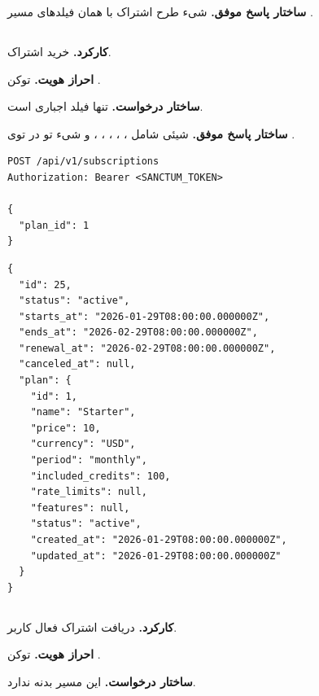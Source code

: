 \textbf{ساختار پاسخ موفق.} شیء طرح اشتراک با همان فیلدهای مسیر
.

\subsection{}
\textbf{کارکرد.} خرید اشتراک.

\textbf{احراز هویت.} توکن .

\textbf{ساختار درخواست.} تنها فیلد اجباری  است.

\textbf{ساختار پاسخ موفق.} شیئی شامل ، ،
، ، ،
 و شیء تو در توی .

\begin{latin}
\begin{lstlisting}[style=jsonStyle]
POST /api/v1/subscriptions
Authorization: Bearer <SANCTUM_TOKEN>

{
  "plan_id": 1
}
\end{lstlisting}
\end{latin}


\begin{latin}
\begin{lstlisting}[style=jsonStyle]
{
  "id": 25,
  "status": "active",
  "starts_at": "2026-01-29T08:00:00.000000Z",
  "ends_at": "2026-02-29T08:00:00.000000Z",
  "renewal_at": "2026-02-29T08:00:00.000000Z",
  "canceled_at": null,
  "plan": {
    "id": 1,
    "name": "Starter",
    "price": 10,
    "currency": "USD",
    "period": "monthly",
    "included_credits": 100,
    "rate_limits": null,
    "features": null,
    "status": "active",
    "created_at": "2026-01-29T08:00:00.000000Z",
    "updated_at": "2026-01-29T08:00:00.000000Z"
  }
}
\end{lstlisting}
\end{latin}


\subsection{}
\textbf{کارکرد.} دریافت اشتراک فعال کاربر.

\textbf{احراز هویت.} توکن .

\textbf{ساختار درخواست.} این مسیر بدنه ندارد.

